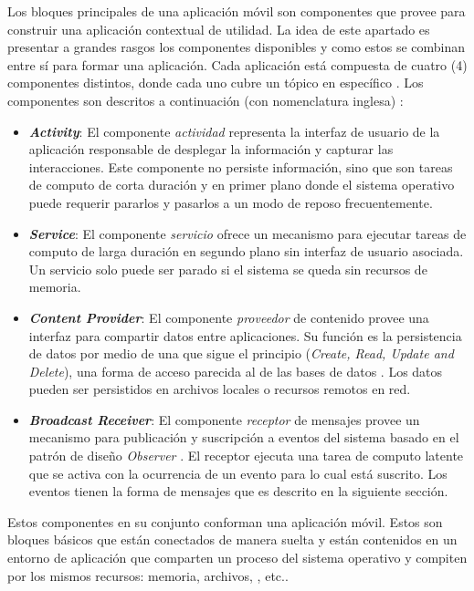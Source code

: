 Los bloques principales de una aplicación móvil son componentes que
\emph{} provee para construir una aplicación contextual
de utilidad. La idea de este apartado es presentar a grandes rasgos
los componentes disponibles y como estos se combinan entre sí para
formar una aplicación. Cada aplicación está compuesta de cuatro (4)
componentes distintos, donde cada uno cubre un tópico en específico
\cite{Gargenta2014}. Los componentes son descritos a continuación
(con nomenclatura inglesa) :
\begin{itemize}
\item \textbf{\emph{Activity}}: El componente \emph{actividad} representa
la interfaz de usuario de la aplicación responsable de desplegar la
información y capturar las interacciones. Este componente no persiste
información, sino que son tareas de computo de corta duración y en
primer plano donde el sistema operativo puede requerir pararlos y
pasarlos a un modo de reposo frecuentemente.
\item \textbf{\emph{Service}}: El componente \emph{servicio} ofrece un mecanismo
para ejecutar tareas de computo de larga duración en segundo plano
sin interfaz de usuario asociada. Un servicio solo puede ser parado
si el sistema se queda sin recursos de memoria.
\item \textbf{\emph{Content Provider}}: El componente \emph{proveedor} de
contenido provee una interfaz para compartir datos entre aplicaciones.
Su función es la persistencia de datos por medio de una 
que sigue el principio  (\emph{Create, Read, Update and
Delete}), una forma de acceso parecida al de las bases de datos .
Los datos pueden ser persistidos en archivos locales o recursos remotos
en red.
\item \textbf{\emph{Broadcast Receiver}}: El componente \emph{receptor}
de mensajes provee un mecanismo para publicación y suscripción a eventos
del sistema basado en el patrón de diseño \emph{Observer} \cite{Shalloway2004}.
El receptor ejecuta una tarea de computo latente que se activa con
la ocurrencia de un evento para lo cual está suscrito. Los eventos
tienen la forma de mensajes que es descrito en la siguiente sección.
\end{itemize}
Estos componentes en su conjunto conforman una aplicación móvil. Estos
son bloques básicos que están conectados de manera suelta y están
contenidos en un entorno de aplicación que comparten un proceso del
sistema operativo y compiten por los mismos recursos: memoria, archivos,
, etc..

